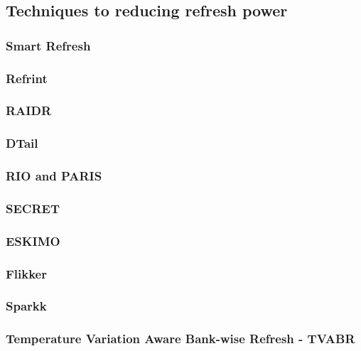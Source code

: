 \subsection{Techniques to reducing refresh power}
\label{sec:red:tech}


\subsubsection*{\textbf{Smart Refresh}}
\label{par:smartrefresh}


\subsubsection*{\textbf{Refrint}}
\label{par:refrint}


\subsubsection*{\textbf{RAIDR}}
\label{par:raidr}


\subsubsection*{\textbf{DTail}}
\label{par:dtail}


\subsubsection*{\textbf{RIO and PARIS}}
\label{par:rioparis}


\subsubsection*{\textbf{SECRET}}
\label{par:secret}


\subsubsection*{\textbf{ESKIMO}}
\label{par:eskimo}


\subsubsection*{\textbf{Flikker}}
\label{par:flikker}


\subsubsection*{\textbf{Sparkk}}
\label{par:sparkk}



\subsubsection*{\textbf{Temperature Variation Aware Bank-wise Refresh - TVABR}}
\label{par:tempaware}
